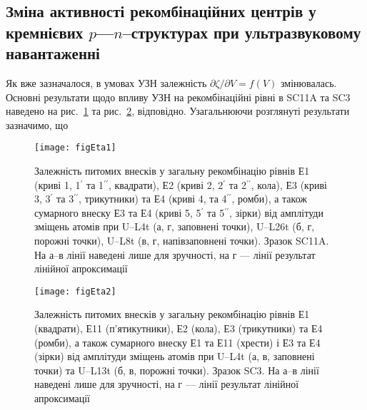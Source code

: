 \subsection{Зміна активності рекомбінаційних центрів у кремнієвих $p$---$n$--структурах при ультразвуковому навантаженні\label{sbBul3}}

Як вже зазначалося, в умовах УЗН залежність $\partial \zeta/ \partial V = f (V)$ змінювалась.
Основні результати щодо впливу УЗН на рекомбінаційні рівні в SC11A та SC3 наведено
на рис.~\ref{figEta1} та рис.~\ref{figEta2}, відповідно.
Узагальнюючи розглянуті результати зазначимо, що


\begin{figure}
\center
\texttt{[image: figEta1]}
\caption{\label{figEta1}
Залежність питомих внесків у загальну рекомбінацію рівнів
Е1 (криві 1, 1$^{\prime}$ та 1$^{\prime\prime}$, квадрати),
Е2 (криві 2, 2$^{\prime}$ та 2$^{\prime\prime}$, кола),
Е3 (криві 3, 3$^{\prime}$ та 3$^{\prime\prime}$, трикутники)
та Е4 (криві 4, та 4$^{\prime\prime}$, ромби),
а також сумарного внеску
Е3 та Е4 (криві 5, 5$^{\prime}$ та 5$^{\prime\prime}$, зірки)
від амплітуди зміщень атомів
при U--L4t (а, г, заповнені точки),
U--L26t (б, г, порожні точки),
U--L8t (в, г, напівзаповнені точки).
Зразок SC11A.
На а--в лінії наведені лише для зручності,
на г --- лінії результат лінійної апроксимації
}%
\end{figure}

\begin{figure}
\center
\texttt{[image: figEta2]}
\caption{\label{figEta2}
Залежність питомих внесків у загальну рекомбінацію рівнів
Е1 (квадрати),
Е11 (п'ятикутники),
Е2 (кола),
Е3 (трикутники)
та Е4 (ромби),
а також сумарного внеску
Е1 та Е11 (хрести) і
Е3 та Е4 (зірки)
від амплітуди зміщень атомів
при U--L4t (а, в, заповнені точки) та
U--L13t (б, в, порожні точки).
Зразок SC3.
На а--в лінії наведені лише для зручності,
на г --- лінії результат лінійної апроксимації
}%
\end{figure}

